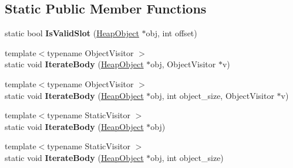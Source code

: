 \subsection*{Static Public Member Functions}
\begin{DoxyCompactItemize}
\item 
static bool {\bfseries Is\+Valid\+Slot} (\hyperlink{classv8_1_1internal_1_1_heap_object}{Heap\+Object} $\ast$obj, int offset)\hypertarget{classv8_1_1internal_1_1_fixed_body_descriptor_aa9e64005e95454e08d614f1a8eae3107}{}\label{classv8_1_1internal_1_1_fixed_body_descriptor_aa9e64005e95454e08d614f1a8eae3107}

\item 
{\footnotesize template$<$typename Object\+Visitor $>$ }\\static void {\bfseries Iterate\+Body} (\hyperlink{classv8_1_1internal_1_1_heap_object}{Heap\+Object} $\ast$obj, Object\+Visitor $\ast$v)\hypertarget{classv8_1_1internal_1_1_fixed_body_descriptor_a056049317ac952f325e5a93d1f4d348d}{}\label{classv8_1_1internal_1_1_fixed_body_descriptor_a056049317ac952f325e5a93d1f4d348d}

\item 
{\footnotesize template$<$typename Object\+Visitor $>$ }\\static void {\bfseries Iterate\+Body} (\hyperlink{classv8_1_1internal_1_1_heap_object}{Heap\+Object} $\ast$obj, int object\+\_\+size, Object\+Visitor $\ast$v)\hypertarget{classv8_1_1internal_1_1_fixed_body_descriptor_ae94e31ee4651ca36822e8eff75ba4971}{}\label{classv8_1_1internal_1_1_fixed_body_descriptor_ae94e31ee4651ca36822e8eff75ba4971}

\item 
{\footnotesize template$<$typename Static\+Visitor $>$ }\\static void {\bfseries Iterate\+Body} (\hyperlink{classv8_1_1internal_1_1_heap_object}{Heap\+Object} $\ast$obj)\hypertarget{classv8_1_1internal_1_1_fixed_body_descriptor_a83ffec194bc75217d2178e3fad22dc73}{}\label{classv8_1_1internal_1_1_fixed_body_descriptor_a83ffec194bc75217d2178e3fad22dc73}

\item 
{\footnotesize template$<$typename Static\+Visitor $>$ }\\static void {\bfseries Iterate\+Body} (\hyperlink{classv8_1_1internal_1_1_heap_object}{Heap\+Object} $\ast$obj, int object\+\_\+size)\hypertarget{classv8_1_1internal_1_1_fixed_body_descriptor_a402b87ef8733380b13fc9d1e0c60696d}{}\label{classv8_1_1internal_1_1_fixed_body_descriptor_a402b87ef8733380b13fc9d1e0c60696d}

\end{DoxyCompactItemize}
